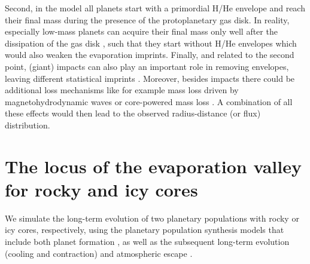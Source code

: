 \documentclass[]{emulateapj}
\begin{document}
Second, in the model all planets start with a primordial H/He envelope and reach their final mass during the presence of the protoplanetary gas disk. In reality, especially low-mass planets can acquire their final mass  only well after the dissipation of the gas disk \citep[e.g.,][]{Baruteau2016}, such that they start without H/He envelopes which would also weaken the evaporation imprints. Finally, and related to the second point, (giant) impacts can also play an important role in removing envelopes, leaving different statistical imprints \citep[e.g.][]{Schlichting2015,LopezRice2016}. {Moreover, besides impacts there could be additional loss mechanisms like for example mass loss driven by magnetohydrodynamic waves \citep{Tanaka2014} or core-powered mass loss \citep[][see also \citealt{Owen2016b}]{ginzburg2016,ginzburg2017}.} A combination of all these effects would then lead to the observed radius-distance (or flux) distribution. 

\section[]{The locus of the evaporation valley for rocky and icy cores}\label{rockyicy}
We simulate the long-term evolution of two planetary populations with rocky or icy cores, respectively, using the planetary population synthesis models that include both planet formation \citep{Alibert2005}, as well as the subsequent long-term evolution (cooling and contraction) and atmospheric escape \citep{Mordasini2012a,Jin2014}. 
\end{document}
